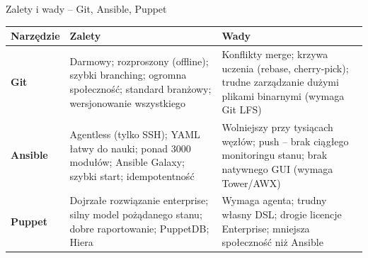 \documentclass{beamer}
\begin{document}
\begin{frame}{Zalety i wady -- Git, Ansible, Puppet}
    \tiny
    \setlength{\tabcolsep}{3pt}
    \begin{tabular}{@{}p{1.8cm}p{4.8cm}p{4.8cm}@{}}
        \toprule
        \textbf{Narz\k{e}dzie}                                                                                                       & \textbf{Zalety} & \textbf{Wady} \\
        \midrule
        \textbf{Git}                                                                                                                 &
        Darmowy; rozproszony (offline); szybki branching; ogromna spo\l{}eczno\'s\'c; standard bran\.zowy; wersjonowanie wszystkiego &
        Konflikty merge; krzywa uczenia (rebase, cherry-pick); trudne zarz\k{a}dzanie du\.zymi plikami binarnymi (wymaga Git LFS)                                      \\
        \addlinespace[4pt]
        \textbf{Ansible}                                                                                                             &
        Agentless (tylko SSH); YAML \l{}atwy do nauki; ponad 3000 modu\l{}\'ow; Ansible Galaxy; szybki start; idempotentno\'s\'c     &
        Wolniejszy przy tysi\k{a}cach w\k{e}z\l{}\'ow; push -- brak ci\k{a}g\l{}ego monitoringu stanu; brak natywnego GUI (wymaga Tower/AWX)                           \\
        \addlinespace[4pt]
        \textbf{Puppet}                                                                                                              &
        Dojrza\l{}e rozwi\k{a}zanie enterprise; silny model po\.z\k{a}danego stanu; dobre raportowanie; PuppetDB; Hiera              &
        Wymaga agenta; trudny w\l{}asny DSL; drogie licencje Enterprise; mniejsza spo\l{}eczno\'s\'c ni\.z Ansible                                                     \\
        \bottomrule
    \end{tabular}
\end{frame}
\end{document}
